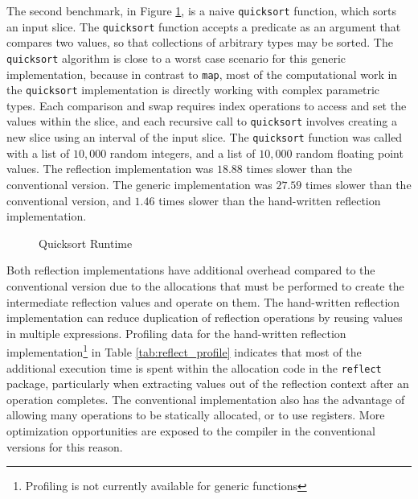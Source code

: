 \documentclass[letterpaper,twocolumn,11pt]{article}
\begin{document}
The second benchmark, in Figure \ref{fig:quicksort}, is a naive \texttt{quicksort} function, which sorts an input slice. The \texttt{quicksort} function accepts a predicate as an argument that compares two values, so that collections of arbitrary types may be sorted. The \texttt{quicksort} algorithm is close to a worst case scenario for this generic implementation, because in contrast to \texttt{map}, most of the computational work in the \texttt{quicksort} implementation is directly working with complex parametric types. Each comparison and swap requires index operations to access and set the values within the slice, and each recursive call to \texttt{quicksort} involves creating a new slice using an interval of the input slice. The \texttt{quicksort} function was called with a list of $10,000$ random integers, and a list of $10,000$ random floating point values. The reflection implementation was $18.88$ times slower than the conventional version. The generic implementation was $27.59$ times slower than the conventional version, and $1.46$ times slower than the hand-written reflection implementation.

\begin{figure}
    \caption{Quicksort Runtime\label{fig:quicksort}}
    \centering
    
\end{figure}

Both reflection implementations have additional overhead compared to the conventional version due to the allocations that must be performed to create the intermediate reflection values and operate on them. The hand-written reflection implementation can reduce duplication of reflection operations by reusing values in multiple expressions. Profiling data for the hand-written reflection implementation\footnote{Profiling is not currently available for generic functions} in Table \ref{tab:reflect_profile} indicates that most of the additional execution time is spent within the allocation code in the \texttt{reflect} package, particularly when extracting values out of the reflection context after an operation completes.  The conventional implementation also has the advantage of allowing many operations to be statically allocated, or to use registers. More optimization opportunities are exposed to the compiler in the conventional versions for this reason.
\end{document}

